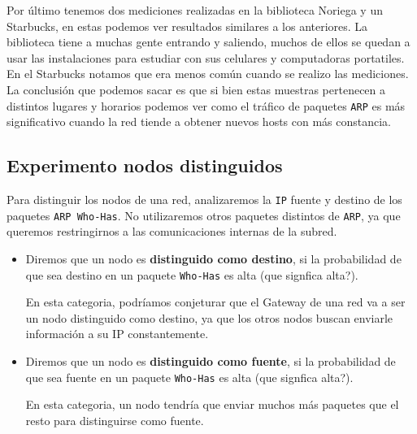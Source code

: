 Por último tenemos dos mediciones realizadas en la biblioteca Noriega y un Starbucks, en estas podemos ver resultados similares a los anteriores. La biblioteca tiene a muchas
gente entrando y saliendo, muchos de ellos se quedan a usar las instalaciones para estudiar con sus celulares y computadoras portatiles. En el Starbucks notamos que era menos
común cuando se realizo las mediciones.\\

La conclusión que podemos sacar es que si bien estas muestras pertenecen a distintos lugares y horarios podemos ver como el tráfico de paquetes \texttt{ARP} es más significativo cuando
la red tiende a obtener nuevos hosts con más constancia.



\subsection{Experimento nodos distinguidos}

Para distinguir los nodos de una red, analizaremos la \texttt{IP} fuente y destino de los paquetes \texttt{ARP Who-Has}.
No utilizaremos otros paquetes distintos de \texttt{ARP}, ya que queremos restringirnos a las comunicaciones internas de la subred.

\begin{itemize}
    \item Diremos que un nodo es \textbf{distinguido como destino}, si la probabilidad de que sea destino en un paquete \texttt{Who-Has} es alta (que signfica alta?).

        En esta categoria, podríamos conjeturar que el Gateway de una red va a ser un nodo distinguido como destino,
        ya que los otros nodos buscan enviarle información a su IP constantemente.
    \item Diremos que un nodo es \textbf{distinguido como fuente}, si la probabilidad de que sea fuente en un paquete \texttt{Who-Has} es alta (que signfica alta?).

        En esta categoria, un nodo tendría que enviar muchos más paquetes que el resto para distinguirse como fuente.
\end{itemize}
